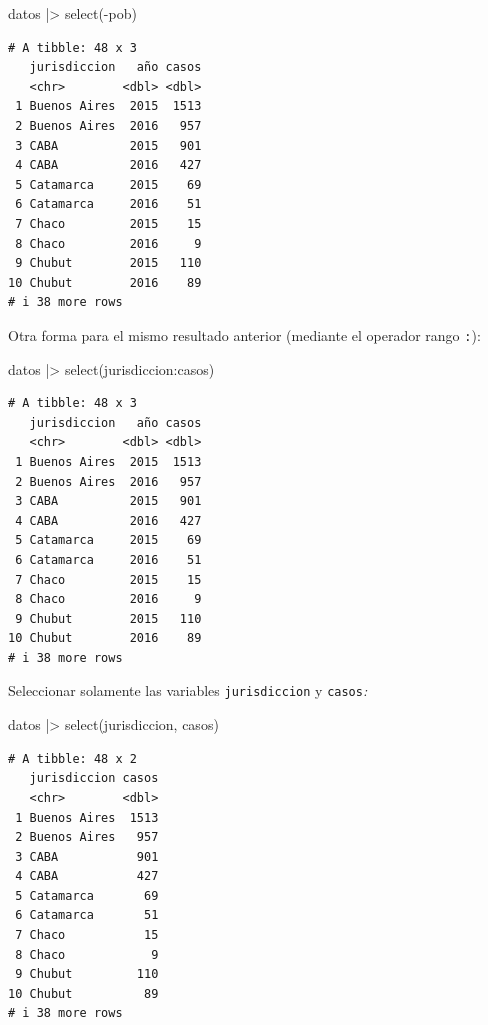 \documentclass[
  spanish,
  letterpaper,
  DIV=11,
  numbers=noendperiod]{scrreprt}
\newenvironment{Shaded}{\begin{snugshade}}{\end{snugshade}}
\newcommand{\FunctionTok}[1]{\textcolor[rgb]{0.28,0.35,0.67}{#1}}
\newcommand{\NormalTok}[1]{\textcolor[rgb]{0.00,0.23,0.31}{#1}}
\newcommand{\SpecialCharTok}[1]{\textcolor[rgb]{0.37,0.37,0.37}{#1}}
\begin{document}
\begin{Shaded}
\begin{Highlighting}[]
\NormalTok{datos }\SpecialCharTok{|\textgreater{}}
  \FunctionTok{select}\NormalTok{(}\SpecialCharTok{{-}}\NormalTok{pob)}
\end{Highlighting}
\end{Shaded}

\begin{verbatim}
# A tibble: 48 x 3
   jurisdiccion   año casos
   <chr>        <dbl> <dbl>
 1 Buenos Aires  2015  1513
 2 Buenos Aires  2016   957
 3 CABA          2015   901
 4 CABA          2016   427
 5 Catamarca     2015    69
 6 Catamarca     2016    51
 7 Chaco         2015    15
 8 Chaco         2016     9
 9 Chubut        2015   110
10 Chubut        2016    89
# i 38 more rows
\end{verbatim}

Otra forma para el mismo resultado anterior (mediante el operador rango
\texttt{:}):

\begin{Shaded}
\begin{Highlighting}[]
\NormalTok{datos }\SpecialCharTok{|\textgreater{}}
  \FunctionTok{select}\NormalTok{(jurisdiccion}\SpecialCharTok{:}\NormalTok{casos)}
\end{Highlighting}
\end{Shaded}

\begin{verbatim}
# A tibble: 48 x 3
   jurisdiccion   año casos
   <chr>        <dbl> <dbl>
 1 Buenos Aires  2015  1513
 2 Buenos Aires  2016   957
 3 CABA          2015   901
 4 CABA          2016   427
 5 Catamarca     2015    69
 6 Catamarca     2016    51
 7 Chaco         2015    15
 8 Chaco         2016     9
 9 Chubut        2015   110
10 Chubut        2016    89
# i 38 more rows
\end{verbatim}

Seleccionar solamente las variables \texttt{jurisdiccion} y
\texttt{casos}\emph{:}

\begin{Shaded}
\begin{Highlighting}[]
\NormalTok{datos }\SpecialCharTok{|\textgreater{}}
  \FunctionTok{select}\NormalTok{(jurisdiccion, casos)}
\end{Highlighting}
\end{Shaded}

\begin{verbatim}
# A tibble: 48 x 2
   jurisdiccion casos
   <chr>        <dbl>
 1 Buenos Aires  1513
 2 Buenos Aires   957
 3 CABA           901
 4 CABA           427
 5 Catamarca       69
 6 Catamarca       51
 7 Chaco           15
 8 Chaco            9
 9 Chubut         110
10 Chubut          89
# i 38 more rows
\end{verbatim}
\end{document}
